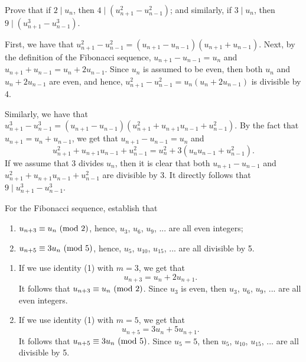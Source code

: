 \begin{exercise}
    Prove that if $2 \mid u_n$, then $4 \mid (u_{n+1}^2 - u_{n-1}^2)$; and similarly, if $3 \mid u_n$, then $9 \mid (u_{n+1}^3 - u_{n-1}^3)$. \\
\end{exercise}

\begin{solution}
    First, we have that $u_{n+1}^2 - u_{n-1}^2 = (u_{n+1} - u_{n-1})(u_{n+1} + u_{n-1})$. Next, by the definition of the Fibonacci sequence, $u_{n+1} - u_{n-1} = u_n$ and $u_{n+1} + u_{n-1} = u_n + 2u_{n-1}$. Since $u_n$ is assumed to be even, then both $u_n$ and $u_n + 2u_{n-1}$ are even, and hence, $u_{n+1}^2 - u_{n-1}^2 = u_n(u_n + 2u_{n-1})$ is divisible by 4.
    
    Similarly, we have that $u_{n+1}^3 - u_{n-1}^3 = (u_{n+1} - u_{n-1})(u_{n+1}^2 + u_{n+1}u_{n-1} + u_{n-1}^2)$. By the fact that $u_{n+1} = u_n + u_{n-1}$, we get that $u_{n+1} - u_{n-1} = u_n$ and
    $$u_{n+1}^2 + u_{n+1}u_{n-1} + u_{n-1}^2 = u_n^2 + 3(u_nu_{n-1} + u_{n-1}^2).$$
    If we assume that 3 divides $u_n$, then it is clear that both $u_{n+1} - u_{n-1}$ and $u_{n+1}^2 + u_{n+1}u_{n-1} + u_{n-1}^2$ are divisible by 3. It directly follows that $9 \mid u_{n+1}^3 - u_{n-1}^3$. \\
\end{solution}

\begin{exercise}
    For the Fibonacci sequence, establish that
    \begin{enumerate}
        \item $u_{n+3} \equiv u_n \ (\mathrm{mod}\ 2)$, hence, $u_3$, $u_6$, $u_9$, ... are all even integers;
        \item $u_{n+5} \equiv 3u_n \ (\mathrm{mod}\ 5)$, hence, $u_5$, $u_{10}$, $u_{15}$, ... are all divisible by 5.\\
    \end{enumerate}
\end{exercise}

\begin{solution}
    \begin{enumerate}
        \item If we use identity (1) with $m = 3$, we get that
        $$u_{n+3} = u_n + 2u_{n+1}.$$
        It follows that $u_{n+3} \equiv u_n \ (\mathrm{mod}\ 2)$. Since $u_3$ is even, then $u_3$, $u_6$, $u_9$, ... are all even integers.
        \item If we use identity (1) with $m = 5$, we get that
        $$u_{n+5} = 3u_n + 5u_{n+1}.$$
        It follows that $u_{n+5} \equiv 3u_n \ (\mathrm{mod}\ 5)$. Since $u_5 = 5$, then $u_5$, $u_{10}$, $u_{15}$, ... are all divisible by 5. \\
    \end{enumerate}
\end{solution}

